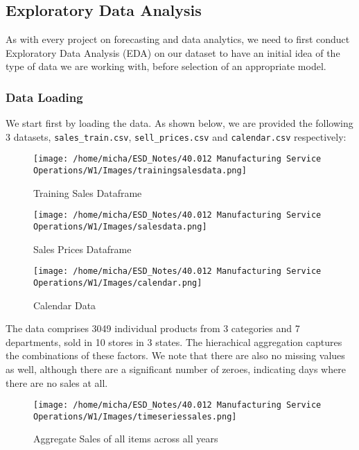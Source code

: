 \documentclass[12pt]{article}
\begin{document}
\subsection*{Exploratory Data Analysis}

As with every project on forecasting and data analytics, we need to first conduct Exploratory Data Analysis (EDA) on our dataset to have an initial idea of the type of data we are working with, before selection of an appropriate model. 

\subsubsection*{Data Loading}

We start first by loading the data. As shown below, we are provided the following 3 datasets, \verb|sales_train.csv|, \verb|sell_prices.csv| and \verb|calendar.csv| respectively: 

\begin{figure}[H]
    \centering
    \texttt{[image: /home/micha/ESD\_Notes/40.012 Manufacturing Service Operations/W1/Images/trainingsalesdata.png]}
    \caption{Training Sales Dataframe}
    \label{fig:6-trainingsales}
\end{figure} 

\begin{figure}[H]
    \centering
    \texttt{[image: /home/micha/ESD\_Notes/40.012 Manufacturing Service Operations/W1/Images/salesdata.png]}
    \caption{Sales Prices Dataframe}
    \label{fig:6-salesdata}
\end{figure} 

\begin{figure}[H]
    \centering
    \texttt{[image: /home/micha/ESD\_Notes/40.012 Manufacturing Service Operations/W1/Images/calendar.png]}
    \caption{Calendar Data}
    \label{fig:6-calendardata}
\end{figure} 

\noindent The data comprises 3049 individual products from 3 categories and 7 departments, sold in 10 stores in 3 states. The hierachical aggregation captures the combinations of these factors. We note that there are also no missing values as well, although there are a significant number of zeroes, indicating days where there are no sales at all. 

\begin{figure}[H]
    \centering
    \texttt{[image: /home/micha/ESD\_Notes/40.012 Manufacturing Service Operations/W1/Images/timeseriessales.png]}
    \caption{Aggregate Sales of all items across all years}
    \label{fig:aggregatesales}
\end{figure} 
\end{document}
